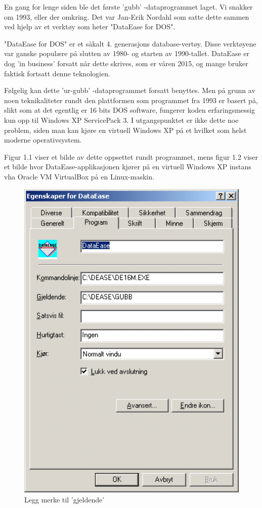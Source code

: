 \documentclass[12pt]{book}
\begin{document}
En gang for lenge siden ble det første 'gubb' -dataprogrammet laget. Vi 
snakker om 1993, eller der omkring. Det var Jan-Erik Nordahl som satte dette  
sammen ved hjelp av et verktøy som heter "DataEase for DOS". 

"DataEase for DOS" er et såkalt 4. generasjons database-vertøy. Disse verktøyene var 
ganske populære på slutten av 1980- og starten av 1990-tallet. DataEase er
dog 'in business' forsatt når dette skrives, som er våren 2015, og mange bruker faktisk 
fortsatt denne teknologien.

Følgelig kan dette 'ur-gubb' -dataprogrammet forsatt benyttes. Men på grunn av noen teknikaliteter rundt den plattformen som 
programmet fra 1993 er basert på, slikt som at det egentlig er 16 bits DOS software, fungerer koden erfaringsmessig kun opp til 
Windows XP ServicePack 3. I utgangspunktet er ikke dette noe problem, siden man kan kjøre en virtuell Windows XP på et hvilket 
som helst moderne operativsystem.

Figur 1.1 viser et bilde av dette oppsettet rundt programmet, mens figur 1.2 viser et bilde hvor DataEase-applikasjonen kjører på en virtuell 
Windows XP instans vha Oracle VM VirtualBox på en Linux-maskin. 

\begin{figure}
\centering
\includegraphics[width=12.0cm]{bilde}
\caption{Legg merke til  'gjeldende'}
\end{figure}
\end{document}
